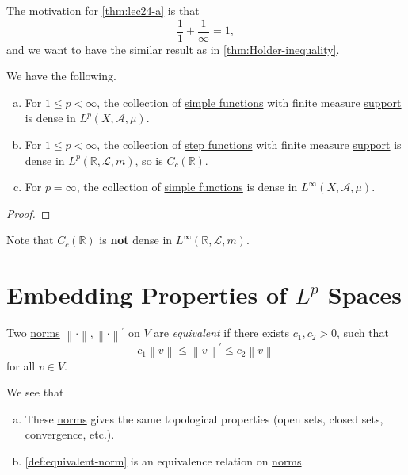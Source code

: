 \begin{remark}
	The motivation for \autoref{thm:lec24-a} is that
	\[
		\frac{1}{1} + \frac{1}{\infty } = 1,
	\]
	and we want to have the similar result as in \autoref{thm:Holder-inequality}.
\end{remark}

\begin{proposition}
	We have the following.
	\begin{enumerate}[(a)]
		\item For \(1\leq p< \infty \), the collection of \hyperref[def:simple-function]{simple functions} with finite measure \hyperref[def:support]{support} is dense in \(L^p(X, \mathcal{A} , \mu )\).
		\item For \(1\leq p<\infty \), the collection of \hyperref[def:step-function]{step functions} with finite measure \hyperref[def:support]{support} is dense in \(L^p(\mathbb{R} , \mathcal{L} , m)\), so is \(C_c(\mathbb{R} )\).
		\item For \(p = \infty \), the collection of \hyperref[def:simple-function]{simple functions} is dense in \(L^{\infty} (X, \mathcal{A} , \mu )\).
	\end{enumerate}
\end{proposition}
\begin{proof}
\end{proof}

\begin{remark}
	Note that \(C_c(\mathbb{R} )\) is \textbf{not} dense in \(L^{\infty} (\mathbb{R} , \mathcal{L} , m)\).
\end{remark}

\section{Embedding Properties of \(L^p\) Spaces}

\begin{definition}\label{def:equivalent-norm}
	Two \hyperref[def:norm]{norms} \(\left\lVert \cdot\right\rVert, \left\lVert \cdot\right\rVert ^\prime  \) on \(V\) are \emph{equivalent} if there exists \(c_1, c_2>0\), such that
	\[
		c_1 \left\lVert v\right\rVert \leq \left\lVert v\right\rVert ^\prime \leq c_2 \left\lVert v\right\rVert
	\]
	for all \(v\in V\).
\end{definition}

\begin{note}
	We see that
	\begin{enumerate}[(a)]
		\item These \hyperref[def:norm]{norms} gives the same topological properties (open sets, closed sets, convergence, etc.).
		\item \autoref{def:equivalent-norm} is an equivalence relation on \hyperref[def:norm]{norms}.
	\end{enumerate}
\end{note}

